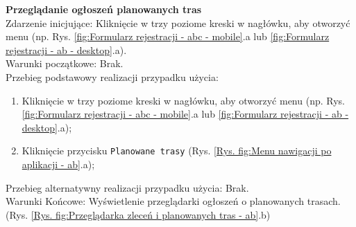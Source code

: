 \textbf{Przeglądanie ogłoszeń planowanych tras} \\
Zdarzenie inicjujące: Kliknięcie w trzy poziome kreski w nagłówku, aby otworzyć menu (np. Rys. \ref{fig:Formularz rejestracji - abc - mobile}.a lub \ref{fig:Formularz rejestracji - ab - desktop}.a). \\
Warunki początkowe: Brak. \\
Przebieg podstawowy realizacji przypadku użycia:
\begin{enumerate}
    \item Kliknięcie w trzy poziome kreski w nagłówku, aby otworzyć menu (np. Rys. \ref{fig:Formularz rejestracji - abc - mobile}.a lub \ref{fig:Formularz rejestracji - ab - desktop}.a);
    \item Kliknięcie przycisku \texttt{Planowane trasy} (Rys. \ref{Rys. fig:Menu nawigacji po aplikacji - ab}.a);
\end{enumerate}
Przebieg alternatywny realizacji przypadku użycia: Brak. \\
Warunki Końcowe: Wyświetlenie przeglądarki ogłoszeń o planowanych trasach. (Rys. \ref{Rys. fig:Przeglądarka zleceń i planowanych tras - ab}.b)\\

